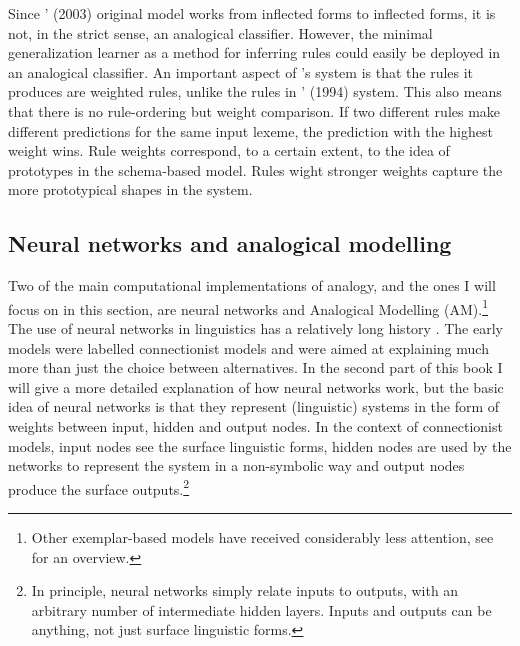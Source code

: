 Since \citeauthor{Albright.2003}' (2003) original model works from inflected forms to inflected forms, it is not, in the strict sense, an analogical classifier. However, the minimal generalization learner as a method for inferring rules could easily be deployed in an analogical classifier. An important aspect of \citet{Albright.2003}'s system is that the rules it produces are weighted rules, unlike the rules in \citeauthor{Viks.1994}' (1994) system. This also means that there is no rule-ordering but weight comparison. If two different rules make different predictions for the same input lexeme, the prediction with the highest weight wins. Rule weights correspond, to a certain extent, to the idea of prototypes in the schema-based model. Rules wight stronger weights capture the more prototypical shapes in the system.


\subsection{Neural networks and analogical modelling}


Two of the main computational implementations of analogy, and the ones I will focus on in this section, are neural networks and Analogical Modelling (AM).\footnote{Other exemplar-based models have received considerably less attention, see \citet{Matthews.2005} for an overview.} The use of neural networks in linguistics has a relatively long history \autocites{Bechtel.2002, Churchland.1989, McClelland.1986, Rumelhart.1986, Rumelhart.1986a}. The early models were labelled connectionist models and were aimed at explaining much more than just the choice between alternatives. In the second part of this book I will give a more detailed explanation of how neural networks work, but the basic idea of neural networks is that they represent (linguistic) systems in the form of weights between input, hidden and output nodes. In the context of connectionist models, input nodes see the surface linguistic forms, hidden nodes are used by the networks to represent the system in a non-symbolic way and output nodes produce the surface outputs.\footnote{In principle, neural networks simply relate inputs to outputs, with an arbitrary number of intermediate hidden layers. Inputs and outputs can be anything, not just surface linguistic forms.}

